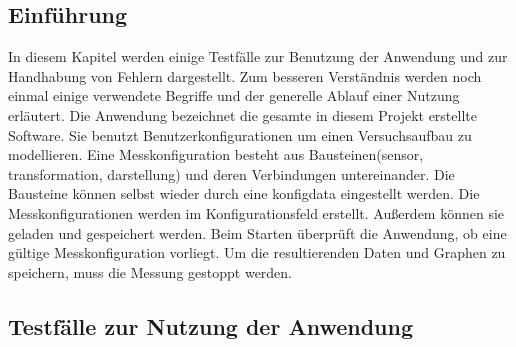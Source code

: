 \documentclass[parskip=full]{scrartcl}
\begin{document}
\subsection{Einführung}

In diesem Kapitel werden einige Testfälle zur Benutzung der Anwendung und zur Handhabung von Fehlern dargestellt. Zum besseren Verständnis werden noch einmal einige verwendete Begriffe und der generelle Ablauf einer Nutzung erläutert. Die Anwendung bezeichnet die gesamte in diesem Projekt erstellte Software. Sie benutzt \gls{Benutzerkonfiguration}en um einen Versuchsaufbau zu modellieren. Eine Messkonfiguration besteht aus Bausteinen(\gls{sensor}, \gls{transformation}, \gls{darstellung}) und deren Verbindungen untereinander. Die Bausteine können selbst wieder  durch eine \gls{konfigdata} eingestellt werden. Die Messkonfigurationen werden im Konfigurationsfeld erstellt. Außerdem können sie geladen und gespeichert werden. Beim Starten überprüft die Anwendung, ob eine gültige Messkonfiguration vorliegt. Um die resultierenden Daten und Graphen zu speichern, muss die Messung gestoppt werden.

\subsection{Testfälle zur Nutzung der Anwendung}
\end{document}
